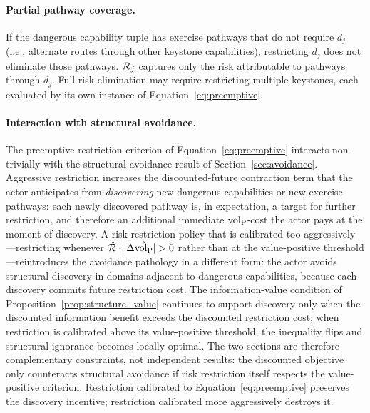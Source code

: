 \paragraph{Partial pathway coverage.} If the dangerous capability tuple has
exercise pathways that do not require $d_j$ (i.e., alternate routes through
other keystone capabilities), restricting $d_j$ does not eliminate those
pathways. $\mathcal{R}_j$ captures only the risk attributable to pathways through
$d_j$. Full risk elimination may require restricting multiple keystones,
each evaluated by its own instance of
Equation~\eqref{eq:preemptive}.

\paragraph{Interaction with structural avoidance.} The preemptive
restriction criterion of Equation~\eqref{eq:preemptive} interacts
non-trivially with the structural-avoidance result of
Section~\ref{sec:avoidance}. Aggressive restriction increases the
discounted-future contraction term that the actor anticipates from
\emph{discovering} new dangerous capabilities or new exercise pathways:
each newly discovered pathway is, in expectation, a target for further
restriction, and therefore an additional immediate ${\operatorname{vol}_{\mathrm{P}}}$-cost the actor
pays at the moment of discovery. A risk-restriction policy that is
calibrated too aggressively---restricting whenever
$\hat{\mathcal{R}} \cdot |\Delta\hat{{\operatorname{vol}_{\mathrm{P}}}}| > 0$ rather than at the value-positive
threshold---reintroduces the avoidance pathology in a different form: the
actor avoids structural discovery in domains adjacent to dangerous
capabilities, because each discovery commits future restriction cost. The
information-value condition of
Proposition~\ref{prop:structure_value} continues to support discovery only
when the discounted information benefit
exceeds the discounted restriction cost; when restriction is calibrated
above its value-positive threshold, the inequality flips and structural
ignorance becomes locally optimal. The two sections are therefore
complementary constraints, not independent results: the discounted
objective only counteracts structural avoidance if risk restriction itself
respects the value-positive criterion. Restriction calibrated to
Equation~\eqref{eq:preemptive} preserves the discovery incentive;
restriction calibrated more aggressively destroys it.

